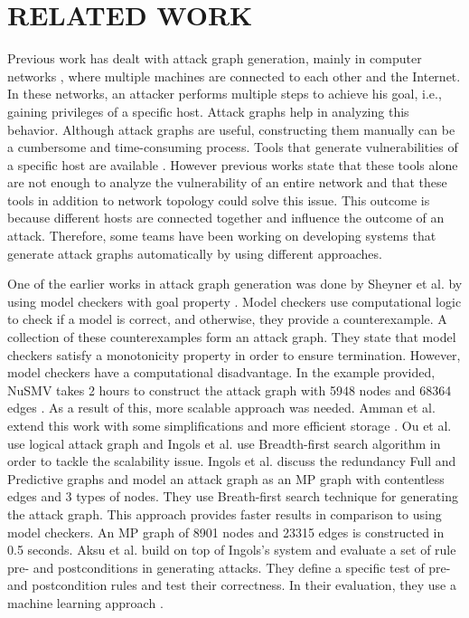 \section{RELATED WORK}
Previous work has dealt with attack graph generation, mainly in computer networks \cite{ingols2006practical, sheyner2002automated, ritchey2000using, ou2006scalable}, where multiple machines are connected to each other and the Internet. In these networks, an attacker performs multiple steps to achieve his goal, i.e., gaining privileges of a specific host. Attack graphs help in analyzing this behavior. Although attack graphs are useful, constructing them manually can be a cumbersome and time-consuming process. Tools that generate vulnerabilities of a specific host are available \cite{clair, artz2002netspa, farmer1990cops}. However previous works state that these tools alone are not enough to analyze the vulnerability of an entire network and that these tools in addition to network topology could solve this issue. This outcome is because different hosts are connected together and influence the outcome of an attack. Therefore, some teams have been working on developing systems that generate attack graphs automatically by using different approaches.

One of the earlier works in attack graph generation was done by Sheyner et al. by using model checkers with goal property \cite{sheyner2002automated}. Model checkers use computational logic to check if a model is correct, and otherwise, they provide a counterexample. A collection of these counterexamples form an attack graph. They state that model checkers satisfy a monotonicity property in order to ensure termination. However, model checkers have a computational disadvantage. In the example provided, NuSMV takes 2 hours to construct the attack graph with 5948 nodes and 68364 edges \cite{sheyner2002automated}. As a result of this, more scalable approach was needed. Amman et al. extend this work with some simplifications and more efficient storage \cite{ritchey2000using}. Ou et al. use logical attack graph \cite{ou2006scalable} and Ingols \cite{ingols2006practical} et al. use Breadth-first search algorithm in order to tackle the scalability issue. Ingols et al. discuss the redundancy Full and Predictive graphs and model an attack graph as an MP graph with contentless edges and 3 types of nodes. They use Breath-first search technique for generating the attack graph. This approach provides faster results in comparison to using model checkers. An MP graph of 8901 nodes and 23315 edges is constructed in 0.5 seconds. Aksu et al. build on top of Ingols's system and evaluate a set of rule pre- and postconditions in generating attacks. They define a specific test of pre- and postcondition rules and test their correctness. In their evaluation, they use a machine learning approach \cite{aksu2018automated}.

